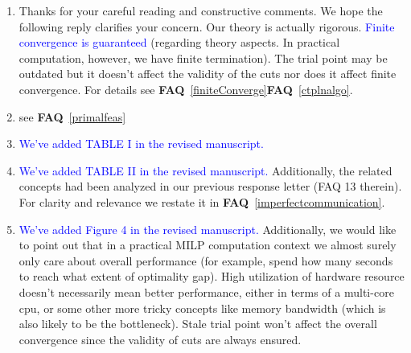 \documentclass[11pt]{article}
\newcommand{\faq}[1]{\textbf{FAQ}~\ref{#1}}
\begin{document}
\begin{enumerate}
    \item Thanks for your careful reading and constructive comments. We hope the following reply clarifies your concern. Our theory is actually rigorous. \textcolor{blue}{Finite convergence is guaranteed} (regarding theory aspects. In practical computation, however, we have finite termination). The trial point may be outdated but it doesn't affect the validity of the cuts nor does it affect finite convergence. For details see \faq{finiteConverge}\faq{ctplnalgo}. 
    \item see \faq{primalfeas}
    \item \textcolor{blue}{We've added TABLE I in the revised manuscript.}
    \item \textcolor{blue}{We've added TABLE II in the revised manuscript.} Additionally, the related concepts had been analyzed in our previous response letter (FAQ 13 therein). For clarity and relevance we restate it in \faq{imperfectcommunication}.
    \item \textcolor{blue}{We've added Figure 4 in the revised manuscript.} Additionally, we would like to point out that in a practical MILP computation context we almost surely only care about overall performance (for example, spend how many seconds to reach what extent of optimality gap). High utilization of hardware resource doesn't necessarily mean better performance, either in terms of a multi-core cpu, or some other more tricky concepts like memory bandwidth (which is also likely to be the bottleneck). Stale trial point won't affect the overall convergence since the validity of cuts are always ensured.
\end{enumerate}
\end{document}
